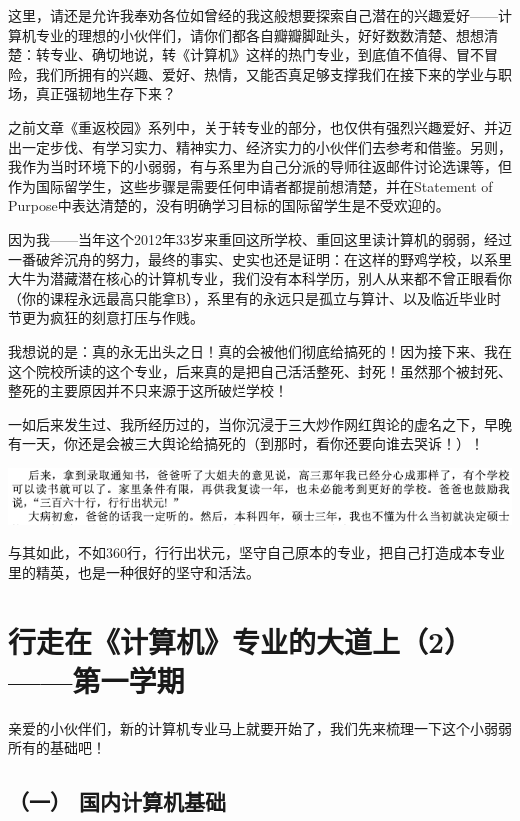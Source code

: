 \documentclass[9pt, b5paper]{article}
\begin{document}
这里，请还是允许我奉劝各位如曾经的我这般想要探索自己潜在的兴趣爱好——计算机专业的理想的小伙伴们，请你们都各自瓣瓣脚趾头，好好数数清楚、想想清楚：转专业、确切地说，转《计算机》这样的热门专业，到底值不值得、冒不冒险，我们所拥有的兴趣、爱好、热情，又能否真足够支撑我们在接下来的学业与职场，真正强韧地生存下来？

之前文章《重返校园》系列中，关于转专业的部分，也仅供有强烈兴趣爱好、并迈出一定步伐、有学习实力、精神实力、经济实力的小伙伴们去参考和借鉴。另则，我作为当时环境下的小弱弱，有与系里为自己分派的导师往返邮件讨论选课等，但作为国际留学生，这些步骤是需要任何申请者都提前想清楚，并在Statement of Purpose中表达清楚的，没有明确学习目标的国际留学生是不受欢迎的。

因为我——当年这个2012年33岁来重回这所学校、重回这里读计算机的弱弱，经过一番破斧沉舟的努力，最终的事实、史实也还是证明：在这样的野鸡学校，以系里大牛为潜藏潜在核心的计算机专业，我们没有本科学历，别人从来都不曾正眼看你（你的课程永远最高只能拿B），系里有的永远只是孤立与算计、以及临近毕业时节更为疯狂的刻意打压与作贱。

我想说的是：真的永无出头之日！真的会被他们彻底给搞死的！因为接下来、我在这个院校所读的这个专业，后来真的是把自己活活整死、封死！虽然那个被封死、整死的主要原因并不只来源于这所破烂学校！

一如后来发生过、我所经历过的，当你沉浸于三大炒作网红舆论的虚名之下，早晚有一天，你还是会被三大舆论给搞死的（到那时，看你还要向谁去哭诉！）！

\begin{center}
\includegraphics[width=.9\linewidth]{./pic/backups_plans_20210424_092841.png}
\end{center}

与其如此，不如360行，行行出状元，坚守自己原本的专业，把自己打造成本专业里的精英，也是一种很好的坚守和活法。

\section{行走在《计算机》专业的大道上（2）——第一学期}
\label{sec:orgb054f8d}

亲爱的小伙伴们，新的计算机专业马上就要开始了，我们先来梳理一下这个小弱弱所有的基础吧！

\subsection{（一） 国内计算机基础}
\label{sec:orgb501d2e}
\end{document}

